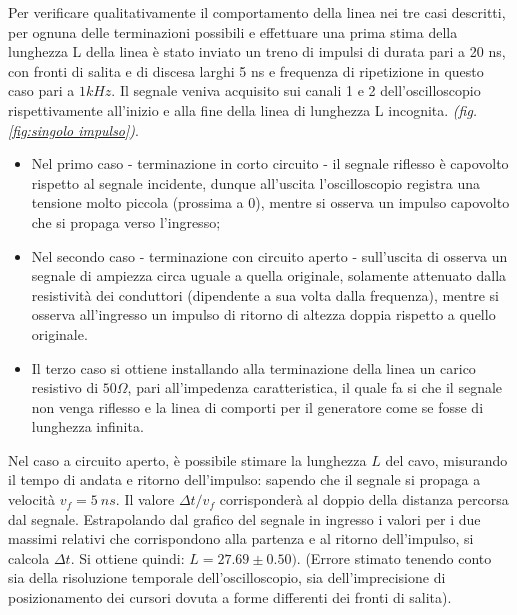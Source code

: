 \documentclass[journal]{IEEEtran}
\begin{document}
Per verificare qualitativamente il comportamento della linea nei tre casi descritti, per ognuna delle terminazioni possibili e effettuare una prima stima della lunghezza L della linea è stato inviato un treno di impulsi di durata pari a 20 ns, con fronti di salita e di discesa larghi 5 ns e frequenza di ripetizione in questo caso pari a $1 kHz$. Il segnale veniva acquisito sui canali 1 e 2 dell'oscilloscopio rispettivamente all'inizio e alla fine della linea di lunghezza L incognita. \textit{(fig. \ref{fig:singolo impulso})}.




\begin{itemize}
    \item Nel primo caso - terminazione in corto circuito - il segnale riflesso è capovolto rispetto al segnale incidente, dunque all'uscita l'oscilloscopio registra una tensione molto piccola (prossima a 0), mentre si osserva un impulso capovolto che si propaga verso l'ingresso;
    \item Nel secondo caso - terminazione con circuito aperto - sull'uscita di osserva un segnale di ampiezza circa uguale a quella originale, solamente attenuato dalla resistività dei conduttori (dipendente a sua volta dalla frequenza), mentre si osserva all'ingresso un impulso di ritorno di altezza doppia rispetto a quello originale.
    \item Il terzo caso si ottiene installando alla terminazione della linea un carico resistivo di $50 \Omega$, pari all'impedenza caratteristica, il quale fa si che il segnale non venga riflesso e la linea di comporti per il generatore come se fosse di lunghezza infinita.
\end{itemize}
 

Nel caso a circuito aperto, è possibile stimare la lunghezza $L$ del cavo, misurando il tempo di andata e ritorno dell'impulso: sapendo che il segnale si propaga a velocità $v_f = 5 \ ns$. Il valore $\Delta t / {v_f}$ corrisponderà al doppio della distanza percorsa dal segnale. 
Estrapolando dal grafico del segnale in ingresso i valori per i due massimi relativi che corrispondono alla partenza e al ritorno dell'impulso, si calcola $\Delta t$. Si ottiene quindi: 
$L = 27.69 \pm 0.50)$. (Errore stimato tenendo conto sia della risoluzione temporale dell'oscilloscopio, sia dell'imprecisione di posizionamento dei cursori dovuta a forme differenti dei fronti di salita).
\end{document}

